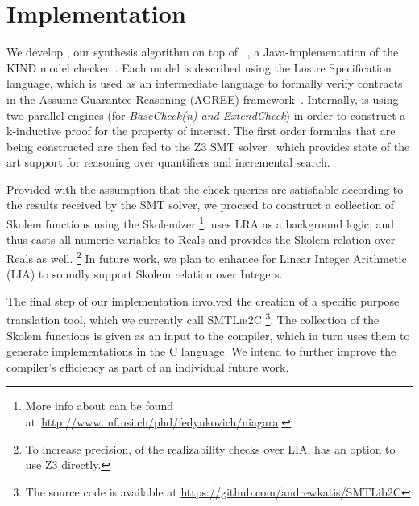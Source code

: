 \section{Implementation}
\label{sec:impl}

We develop \jkindsynt, our synthesis algorithm on top of \jkind~\cite{jkind},
a Java-implementation of the \textsc{KIND} model
checker~\cite{Hagen08:kind}. Each model is described using the Lustre
Specification language, which is used as an intermediate language to formally verify contracts in the
Assume-Guarantee Reasoning (\textsc{AGREE}) framework~\cite{NFM2012:CoGaMiWhLaLu}.
Internally, \jkind is using two parallel engines (for \textit{BaseCheck(n) and
\textit{ExtendCheck}}) in order to construct a k-inductive proof for the
property of interest.
The first order formulas that are being constructed are then fed to the \textsc{Z3} SMT
solver~\cite{DeMoura08:z3} which provides state of the art support for reasoning
over quantifiers and incremental search.

Provided with the assumption that the check queries are satisfiable according to
the results received by the SMT solver, we proceed to construct a collection of
Skolem functions using the \aeval Skolemizer%
\footnote{More info about \aeval can be found at~\url{http://www.inf.usi.ch/phd/fedyukovich/niagara}.}.
\aeval  uses LRA as a background logic, and thus casts all numeric variables to Reals and provides the Skolem relation over Reals as well.%
\footnote{To increase precision, of the realizability checks over LIA, \jkind has an option to use \textsc{Z3} directly.}
In future work, we plan to enhance  \aeval for Linear Integer Arithmetic (LIA) to soundly support Skolem relation over Integers.

The final step of our implementation involved the creation of a specific purpose
translation tool, which we currently call \textsc{SMTLib2C}%
\footnote{The source code
is available at \url{https://github.com/andrewkatis/SMTLib2C}}. The collection
of the Skolem functions is given as an input to the compiler, which in turn uses
them to generate implementations in the C language. We intend to further improve
the compiler's efficiency as part of an individual future work.


